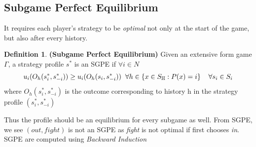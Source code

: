 \documentclass{article}
\theoremstyle{definition}
\newtheorem{defn}{Definition}[section]
\begin{document}
\subsection{Subgame Perfect Equilibrium}
It requires each player’s strategy to be \textit{optimal} not only at the start of the game, but also after every history.
\begin{defn}
\textbf{(Subgame Perfect Equilibrium)} Given an extensive form game $\Gamma$, a strategy profile $s^*$ is an SGPE if $\forall i\in N$
$$u_i(O_h(s_i^*, s_{-i}^*))\geq u_i(O_h(s_i, s_{-i}^*)) \hspace{2mm}\forall h\in\{x\in S_\mathbb{H}:P(x) = i\} \hspace{4mm} \forall s_i\in S_i$$ where $O_h(s_i^*, s_{-i}^*)$ is the outcome corresponding to history h in the strategy profile $(s_i^*, s_{-i}^*)$
\end{defn}
Thus the profile should be an equilibrium for every subgame as well. From SGPE, we see $(out, fight)$ is not an SGPE as \textit{fight} is not optimal if first chooses \textit{in}. SGPE are computed using \textit{Backward Induction}
\end{document}
